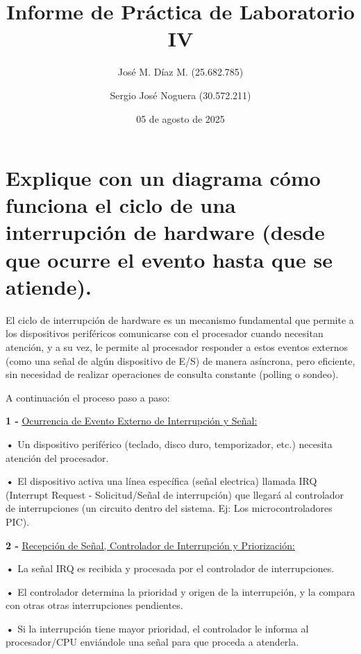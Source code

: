 \documentclass{article}
\title{Informe de Práctica de Laboratorio IV}
\author{José M. Díaz M. (25.682.785) \and Sergio José Noguera (30.572.211)}
\date{05 de agosto de 2025}
\begin{document}
\maketitle


\section{Explique con un diagrama cómo funciona el ciclo de una interrupción de hardware (desde que ocurre el evento hasta que se atiende).}

\quad

{El ciclo de interrupción de hardware es un mecanismo fundamental que permite a los dispositivos periféricos comunicarse con el procesador cuando necesitan atención, y a su vez, le permite al procesador responder a estos eventos externos (como una señal de algún dispositivo de E/S) de manera asíncrona, pero eficiente, sin necesidad de realizar operaciones de consulta constante (polling o sondeo).}

\quad

{ A continuación el proceso paso a paso:}

\quad

\textbf{1 -  } {\underline{Ocurrencia de Evento Externo de Interrupción y Señal: }}

\quad

\textbf{    •} { Un dispositivo periférico (teclado, disco duro, temporizador, etc.) necesita atención del procesador.}

\textbf{    •} { El dispositivo activa una línea específica (señal electrica) llamada IRQ (Interrupt Request - Solicitud/Señal de interrupción) que llegará al controlador de interrupciones (un circuito dentro del sistema. Ej: Los microcontroladores PIC).}

\quad

\textbf{2 -  } {\underline{ Recepción de Señal, Controlador de Interrupción y Priorización: }}

\quad

\textbf{    •} { La señal IRQ es recibida y procesada por el controlador de interrupciones.}

\textbf{    •} { El controlador determina la prioridad y origen de la interrupción, y la compara con otras otras interrupciones pendientes.}

\textbf{    •} { Si la interrupción tiene mayor prioridad, el controlador le informa al procesador/CPU enviándole una señal para que proceda a atenderla.}


\quad
\end{document}
